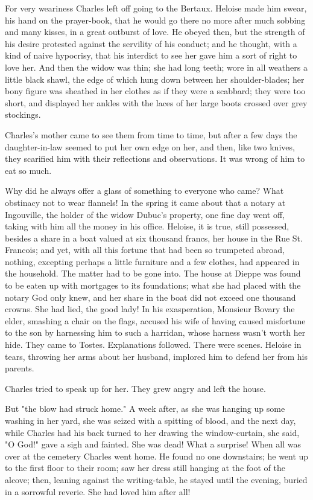 \documentclass{tufte-book}
\begin{document}
For very weariness Charles left off going to the Bertaux. Heloise made
him swear, his hand on the prayer-book, that he would go there no more
after much sobbing and many kisses, in a great outburst of love. He
obeyed then, but the strength of his desire protested against the
servility of his conduct; and he thought, with a kind of naive
hypocrisy, that his interdict to see her gave him a sort of right to
love her. And then the widow was thin; she had long teeth; wore in all
weathers a little black shawl, the edge of which hung down between her
shoulder-blades; her bony figure was sheathed in her clothes as if they
were a scabbard; they were too short, and displayed her ankles with the
laces of her large boots crossed over grey stockings.

Charles's mother came to see them from time to time, but after a few
days the daughter-in-law seemed to put her own edge on her, and
then, like two knives, they scarified him with their reflections and
observations. It was wrong of him to eat so much.

Why did he always offer a glass of something to everyone who came?
What obstinacy not to wear flannels! In the spring it came about that a
notary at Ingouville, the holder of the widow Dubuc's property, one fine
day went off, taking with him all the money in his office. Heloise,
it is true, still possessed, besides a share in a boat valued at six
thousand francs, her house in the Rue St. Francois; and yet, with all
this fortune that had been so trumpeted abroad, nothing, excepting
perhaps a little furniture and a few clothes, had appeared in the
household. The matter had to be gone into. The house at Dieppe was found
to be eaten up with mortgages to its foundations; what she had placed
with the notary God only knew, and her share in the boat did not exceed
one thousand crowns. She had lied, the good lady! In his exasperation,
Monsieur Bovary the elder, smashing a chair on the flags, accused his
wife of having caused misfortune to the son by harnessing him to such
a harridan, whose harness wasn't worth her hide. They came to Tostes.
Explanations followed. There were scenes. Heloise in tears, throwing her
arms about her husband, implored him to defend her from his parents.

Charles tried to speak up for her. They grew angry and left the house.

But "the blow had struck home." A week after, as she was hanging up some
washing in her yard, she was seized with a spitting of blood, and
the next day, while Charles had his back turned to her drawing the
window-curtain, she said, "O God!" gave a sigh and fainted. She was
dead! What a surprise! When all was over at the cemetery Charles went
home. He found no one downstairs; he went up to the first floor to
their room; saw her dress still hanging at the foot of the alcove; then,
leaning against the writing-table, he stayed until the evening, buried
in a sorrowful reverie. She had loved him after all!
\end{document}
